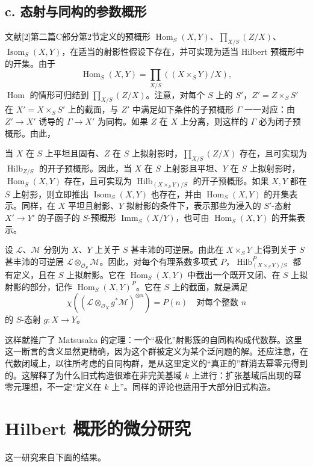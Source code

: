 \subsection*{c. 态射与同构的参数概形}
文献[2]第二篇C部分第2节定义的预概形 $\operatorname{Hom}_S(X,Y)$、$\prod_{X/S}(Z/X)$、$\operatorname{Isom}_S(X,Y)$，在适当的射影性假设下存在，并可实现为适当 Hilbert 预概形中的开集。由于
\[
\operatorname{Hom}_S(X,Y)=\prod_{X/S}((X\times_SY)/X),
\]
$\operatorname{Hom}$ 的情形可归结到 $\prod_{X/S}(Z/X)$。注意，对每个 $S$ 上的 $S'$，$Z'=Z\times_SS'$ 在 $X'=X\times_SS'$ 上的截面，与 $Z'$ 中满足如下条件的子预概形 $\Gamma$ 一一对应：由 $Z'\to X'$ 诱导的 $\Gamma\to X'$ 为同构。如果 $Z$ 在 $X$ 上分离，则这样的 $\Gamma$ 必为闭子预概形。由此，

当 $X$ 在 $S$ 上平坦且固有、$Z$ 在 $S$ 上拟射影时，$\prod_{X/S}(Z/X)$ 存在，且可实现为 $\operatorname{Hilb}_{Z/S}$ 的开子预概形。因此，当 $X$ 在 $S$ 上射影且平坦、$Y$ 在 $S$ 上拟射影时，$\operatorname{Hom}_S(X,Y)$ 存在，且可实现为 $\operatorname{Hilb}_{(X\times_SY)/S}$ 的开子预概形。如果 $X,Y$ 都在 $S$ 上射影，则立即推出 $\operatorname{Isom}_S(X,Y)$ 也存在，并由 $\operatorname{Hom}_S(X,Y)$ 的开集表示。同样，在 $X$ 平坦且射影、$Y$ 拟射影的条件下，表示那些为浸入的 $S'$-态射 $X'\to Y'$ 的子函子的 $S$-预概形 $\operatorname{Imm}_S(X/Y)$，也可由 $\operatorname{Hom}_S(X,Y)$ 的开集表示。

设 $\mathcal L$、$\mathcal M$ 分别为 $X$、$Y$ 上关于 $S$ 甚丰沛的可逆层。由此在 $X\times_SY$ 上得到关于 $S$ 甚丰沛的可逆层 $\mathcal L\otimes_{\mathcal O_S}\mathcal M$。因此，对每个有理系数多项式 $P$，$\operatorname{Hilb}^P_{(X\times_SY)/S}$ 都有定义，且在 $S$ 上拟射影。它在 $\operatorname{Hom}_S(X,Y)$ 中截出一个既开又闭、在 $S$ 上拟射影的部分，记作 $\operatorname{Hom}_S(X,Y)^P$。它在 $S$ 上的截面，就是满足
\[
\chi\!\left((\mathcal L\otimes_{\mathcal O_X}g^*\mathcal M)^{\otimes n}\right)=P(n)
\quad\text{对每个整数 }n
\]
的 $S$-态射 $g:X\to Y$。

这样就推广了 Matsusaka 的定理：一个“极化”射影簇的自同构构成代数群。这里这一断言的含义显然更精确，因为这个群被定义为某个泛问题的解。还应注意，在代数闭域上，以往所考虑的自同构群，是从这里定义的“真正的”群消去幂零元得到的。这解释了为什么旧式构造很难在非完美基域 $k$ 上进行：扩张基域后出现的幂零元理想，不一定“定义在 $k$ 上”。同样的评论也适用于大部分旧式构造。

\section{Hilbert 概形的微分研究}
这一研究来自下面的结果。

